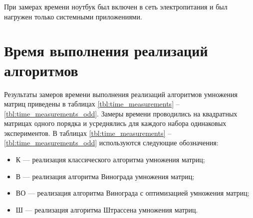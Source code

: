 При замерах времени ноутбук был включен в сеть электропитания и был нагружен только системными приложениями.

\section{Время выполнения реализаций алгоритмов}

Результаты замеров времени выполнения реализаций алгоритмов умножения матриц приведены в таблицах \ref{tbl:time_measurements} -- \ref{tbl:time_measurements_odd}.
Замеры времени проводились на квадратных матрицах одного порядка и усреднялись для каждого набора одинаковых экспериментов.
В таблицах \ref{tbl:time_measurements} -- \ref{tbl:time_measurements_odd} используются следующие обозначения: 
\begin{itemize}
	\item К --- реализация классического алгоритма умножения матриц;
	\item В --- реализация алгоритма Винограда умножения матриц;
	\item ВО --- реализация алгоритма Винограда с оптимизацией умножения матриц;
	\item Ш --- реализация алгоритма Штрассена умножения матриц.
\end{itemize}

